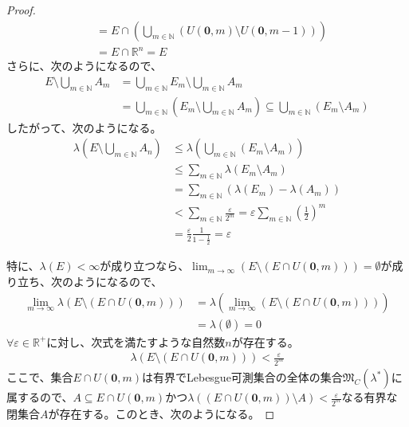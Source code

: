 \documentclass[dvipdfmx]{jsarticle}
\begin{document}
\begin{proof}
\begin{align*}
&= E \cap \left( \bigcup_{m \in \mathbb{N}} \left( U\left( \mathbf{0},m \right) \setminus U\left( \mathbf{0},m - 1 \right) \right) \right)\\
&= E \cap \mathbb{R}^{n} = E
\end{align*}
さらに、次のようになるので、
\begin{align*}
E \setminus \bigcup_{m \in \mathbb{N}} A_{m} &= \bigcup_{m \in \mathbb{N}} E_{m} \setminus \bigcup_{m \in \mathbb{N}} A_{m}\\
&= \bigcup_{m \in \mathbb{N}} \left( E_{m} \setminus \bigcup_{m \in \mathbb{N}} A_{m} \right) \subseteq \bigcup_{m \in \mathbb{N}} \left( E_{m} \setminus A_{m} \right)
\end{align*}
したがって、次のようになる。
\begin{align*}
\lambda\left( E \setminus \bigcup_{m \in \mathbb{N}} A_{n} \right) &\leq \lambda\left( \bigcup_{m \in \mathbb{N}} \left( E_{m} \setminus A_{m} \right) \right)\\
&\leq \sum_{m \in \mathbb{N}} {\lambda\left( E_{m} \setminus A_{m} \right)}\\
&= \sum_{m \in \mathbb{N}} \left( \lambda\left( E_{m} \right) - \lambda\left( A_{m} \right) \right)\\
&< \sum_{m \in \mathbb{N}} \frac{\varepsilon}{2^{m}} = \varepsilon\sum_{m \in \mathbb{N}} \left( \frac{1}{2} \right)^{m}\\
&= \frac{\varepsilon}{2}\frac{1}{1 - \frac{1}{2}} = \varepsilon
\end{align*}\par
特に、$\lambda(E) < \infty$が成り立つなら、$\lim_{m \rightarrow \infty}\left( E \setminus \left( E \cap U\left( \mathbf{0},m \right) \right) \right) = \emptyset$が成り立ち、次のようになるので、
\begin{align*}
\lim_{m \rightarrow \infty}{\lambda\left( E \setminus \left( E \cap U\left( \mathbf{0},m \right) \right) \right)} &= \lambda\left( \lim_{m \rightarrow \infty}\left( E \setminus \left( E \cap U\left( \mathbf{0},m \right) \right) \right) \right)\\
&= \lambda(\emptyset) = 0
\end{align*}
$\forall\varepsilon \in \mathbb{R}^{+}$に対し、次式を満たすような自然数$n$が存在する。
\begin{align*}
\lambda\left( E \setminus \left( E \cap U\left( \mathbf{0},m \right) \right) \right) < \frac{\varepsilon}{2^{m}}
\end{align*}
ここで、集合$E \cap U\left( \mathbf{0},m \right)$は有界でLebesgue可測集合の全体の集合$\mathfrak{M}_{C}\left( \lambda^{*} \right)$に属するので、$A \subseteq E \cap U\left( \mathbf{0},m \right)$かつ$\lambda\left( \left( E \cap U\left( \mathbf{0},m \right) \right) \setminus A \right) < \frac{\varepsilon}{2^{m}}$なる有界な閉集合$A$が存在する。このとき、次のようになる。

\end{proof}
\end{document}
